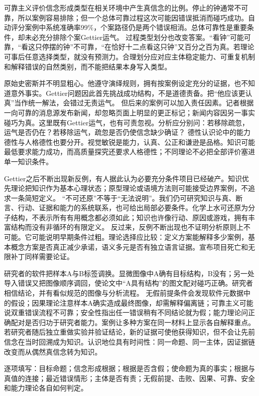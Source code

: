 可靠主义评价信念形成类型在相关环境中产生真信念的比例。停止的钟通常不可靠，所以案例容易排除；但一个总体可靠过程这次可能因错误抵消而碰巧成功。自动评分案例中系统准确率99\%，个案路径仍是两个错误相消。总体可靠性是重要条件，却未必充分排除个案Gettier运气。 过程类型划分也改变答案。“看钟”可能可靠，“看这只停摆的钟”不可靠，“在恰好十二点看这只钟”又百分之百为真。若理论可事后任意选择类型，就没有预测力。合理划分应对应主体稳定能力、可重复机制和解释错误的自然类别，而不能把结果本身写入类型。

原始史密斯并不明显粗心。他遵守演绎规则，拥有按案例设定充分的证据，也不知道意外事实。Gettier问题因此首先挑战成功结构，不是道德责备。把“他应该更认真”当作统一解法，会错过无责运气。 但后来的案例可以加入责任因素。记者根据一向可靠的消息源发布新闻，却忽略页面上明显的更正标记；新闻内容因另一事实碰巧为真。这里既有Gettier运气，也有可责忽视。分析应分别问：若移除疏忽，运气是否仍在？若移除运气，疏忽是否仍使信念缺少确证？ 德性认识论中的能力德性与人格德性也要分开。视觉敏锐是能力，认真、公正和谦逊是品格。知识可能最低要求能力成功，而高质量探究还要求人格德性；不同理论不必把全部评价塞进单一知识条件。

Gettier之后不断出现新反例，有人据此认为必要充分条件项目已经破产。知识优先理论把知识作为基本心理状态\parencite{williamson2000}；原型理论或语境方法则可能接受边界案例，不追求一条简短定义。 “不可还原”不等于“无法说明”。我们仍可研究知识与真、断言、行动、证据和能力的系统联系，也可给出局部必要条件。化学上水可还原为分子结构，不表示所有有用概念都必须如此；知识也许像行动、原因或游戏，拥有丰富结构而没有非循环的有限定义。 反过来，反例不断出现也不证明分析原则上不可能。它可能说明早期条件过粗。理论选择应比较：定义方案能解释多少案例，基本概念方案是否真正减少承诺，语义多元是否有独立语言证据。宣布项目死亡和无限补丁同样需要论证。

研究者的软件把样本A与B标签调换。显微图像中A确有目标结构，B没有；另一处导入错误又把图像顺序调回，使论文中“A具有结构”的图文配对碰巧正确。研究者相信结论，并有看似规范的图像与分析流程。 无假前提条件会发现软件元数据中的假设；因果理论注意样本A确实造成最终图像，却需解释偏离链；可靠主义可能说双重错误流程不可靠；安全性指出任一错误稍有不同结论就为假；能力理论问正确配对是否归功于研究者能力。案例让多种方案在同一材料上显示各自解释重点。 若研究者随后独立重做实验并验证结论，新的证据可使他获得知识，但不会让先前信念在当时回溯成为知识。认识地位具有时间性：同一命题、同一主体，因证据链改变而从偶然真信念转为知识。

\begin{tcolorbox}[breakable,colback=white,colframe=blue!30!black,title={Gettier分析表},fonttitle=\bfseries]
逐项填写：目标命题；信念形成根据；根据是否含假；使命题为真的事实；根据与真值的连接；最近错误情形；主体是否有责；无假前提、击败、因果、可靠、安全和能力理论各自如何判定。
\end{tcolorbox}

